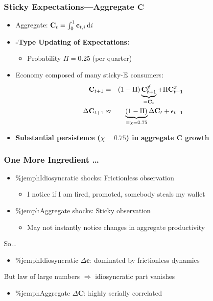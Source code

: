 \documentclass{beamer}\usepackage{dcolumn}
\newcommand{\jbemph}[1]{\textbf{\color{SlideNavy}#1}}
\begin{document}
\begin{frame}
\frametitle{Sticky Expectations---Aggregate $\mathbf{C}$}

\begin{itemize}
\setlength{\itemsep}{2mm}
\item Aggregate: $\mathbf{C}_{t} = \int_{0}^{1} \mathbf{c}_{t,i}\,\text{d}i$
\item \jbemph{\cite{calvoPrices}-Type Updating of Expectations:}
\begin{itemize}
\item Probability $\Pi = 0.25$ (per quarter)
\end{itemize}

\item Economy composed of many sticky-$\mathbb{E}$ consumers:
\begin{eqnarray*}
 \mathbf{C}_{t+1} & = & (1-\Pi) \underbrace{\mathbf{C}^{\cancel{{\pi}}}_{t+1}}_{=\mathbf{C}_{t}} \label{eq:Ctp1} + \Pi \mathbf{C}^{{\pi}}_{t+1}
 \\
  \Delta \mathbf{C}_{t+1} & \approx & \underbrace{(1-\Pi)}_{{}\equiv\chi=0.75} \Delta \mathbf{C}_{t} + \epsilon_{t+1}
\end{eqnarray*}
\item \jbemph{Substantial persistence ($\chi=0.75$) in aggregate C growth}
\end{itemize}
\end{frame}

\begin{frame}
\frametitle{One More Ingredient \dots}

\begin{itemize}
\setlength{\itemsep}{2mm}
\item[] \%jemph{Idiosyncratic shocks:} Frictionless observation
  \begin{itemize}
  \setlength{\itemsep}{1mm}
  \item I notice if I am fired, promoted, somebody steals my wallet
  \end{itemize}
\item[] \%jemph{Aggregate shocks:} Sticky observation
 \begin{itemize}
   \setlength{\itemsep}{1mm}
  \item May not instantly notice changes in aggregate productivity
  \end{itemize}
\end{itemize}
\bigskip
So...
\begin{itemize}
  \setlength{\itemsep}{1mm}
\item[]  \%jemph{Idiosyncratic $\Delta \mathbf{c}$}: dominated by frictionless dynamics
\end{itemize}
But law of large numbers $\Rightarrow$ idiosyncratic part vanishes
\begin{itemize}
\item[]  \%jemph{Aggregate     $\Delta \mathbf{C}$}: highly serially correlated
\end{itemize}

\end{frame}
\end{document}
